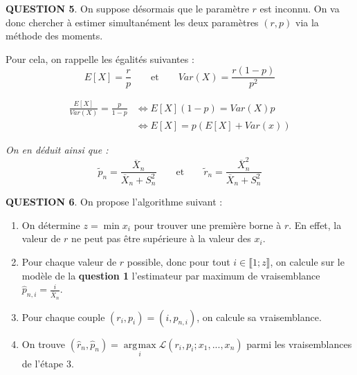 \documentclass[a4paper,11pt]{article}
\DeclareMathOperator*{\argmax}{\arg\!\max}
\newcommand{\quest}[1]{\small\textbf{#1}\normalsize}
\theoremstyle{nonumberplain}
\theoremstyle{nonumberplain}
\theoremstyle{nonumberplain}
\theoremstyle{nonumberplain}
\begin{document}
      \bigskip
      \medskip
      \quest{QUESTION 5}. On suppose désormais que le paramètre $r$ est inconnu.
      On va donc chercher à estimer simultanément les deux paramètres $(r, p)$ via la méthode des moments.

      \medskip
      Pour cela, on rappelle les égalités suivantes :
      \[
            E[X] = \frac{r}{p}\qquad\text{et}\qquad Var(X) = \frac{r (1 - p)}{p^2}
      \]

      \begin{calculs}
          \vspace{-2ex}
          \begin{equation*}
          \begin{split}
              \frac{E[X]}{Var(X)} = \frac{p}{1 - p} & \iff E[X](1 - p) = Var(X) p \\
                                                    & \iff E[X] = p(E[X] + Var(x))
          \end{split}
          \end{equation*}

          \emph{On en déduit ainsi que :}
          \[
                \tilde{p}_n = \frac{\overline{X}_n}{\overline{X}_n + S_n^2}\qquad\text{et}\qquad \tilde{r}_n = \frac{\overline{X}_n^2}{\overline{X}_n + S_n^2}
          \]
      \end{calculs}

      \medskip
      \bigskip
      \quest{QUESTION 6}. On propose l'algorithme suivant :

        \begin{enumerate}
            \item On détermine $z = \min x_i$ pour trouver une première borne à $r$.\newline
            En effet, la valeur de $r$ ne peut pas être supérieure à la valeur des $x_i$. \newline

            \item Pour chaque valeur de $r$ possible, donc pour tout $i \in \llbracket 1; z \rrbracket$, on calcule
            sur le modèle de la \textbf{question 1} l'estimateur par maximum de vraisemblance $\hat{p}_{n, i} = \frac{i}{\overline{X}_n}$.\newline

            \item Pour chaque couple $(r_i, p_i) = (i, \hat{p}_{n, i})$, on calcule sa vraisemblance.\newline

            \item On trouve $(\hat{r}_{n}, \hat{p}_{n}) = \argmax\limits_{i} \mathcal{L}(r_i, p_i; x_1, ..., x_n)$ parmi les vraisemblances de l'étape 3.
        \end{enumerate}
\end{document}
